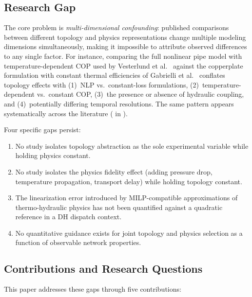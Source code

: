 \documentclass[review,3p]{elsarticle}
\begin{document}
\subsection{Research Gap}
\label{sec:gap}

The core problem is \emph{multi-dimensional confounding}: published
comparisons between different topology and physics representations
change multiple modeling dimensions simultaneously, making it
impossible to attribute observed differences to any single factor.
For instance, comparing the full nonlinear pipe model with
temperature-dependent COP used by Vesterlund et
al.~\cite{Vesterlund2017} against the copperplate formulation with
constant thermal efficiencies of Gabrielli et
al.~\cite{Gabrielli2018} conflates topology effects with
(1)~NLP vs.\ constant-loss formulations, (2)~temperature-dependent
vs.\ constant COP, (3)~the presence or absence of hydraulic
coupling, and (4)~potentially differing temporal resolutions. The
same pattern appears systematically across the literature
( in ).

Four specific gaps persist:
\begin{enumerate}[nosep]
    \item No study isolates topology abstraction as the sole
    experimental variable while holding physics constant.
    \item No study isolates the physics fidelity effect (adding
    pressure drop, temperature propagation, transport delay) while
    holding topology constant.
    \item The linearization error introduced by MILP-compatible
    approximations of thermo-hydraulic physics has not been
    quantified against a quadratic reference in a DH dispatch
    context.
    \item No quantitative guidance exists for joint topology and
    physics selection as a function of observable network properties.
\end{enumerate}

\subsection{Contributions and Research Questions}
\label{sec:contributions}

This paper addresses these gaps through five contributions:
\end{document}
